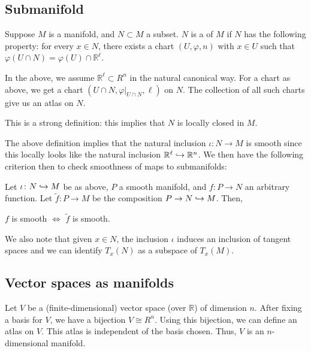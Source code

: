 \documentclass[12pt]{article}
\begin{document}
\subsection{Submanifold}

\begin{defn} \label{defn:submanifold}
	Suppose $M$ is a manifold, and $N \subset M$ a subset. $N$ is a  of $M$ if $N$ has the following property: for every $x \in N$, there exists a chart $(U, \varphi, n)$ with $x \in U$ such that $\varphi(U \cap N) = \varphi(U) \cap \mathbb{R}^{\ell}$. 
\end{defn}
\begin{rem} \label{rem:submanifold}
	In the above, we assume $\mathbb{R}^{\ell} \subset R^{n}$ in the natural canonical way. \newline
	For a chart as above, we get a chart $(U \cap N, \varphi|_{U \cap N}, \ell)$ on $N$. 
	The collection of all such charts give us an atlas on $N$.

	This is a strong definition: this implies that $N$ is locally closed in $M$.
\end{rem}

The above definition implies that the natural inclusion $\iota \colon N \to M$ is smooth since this locally looks like the natural inclusion $\mathbb{R}^{\ell} \hookrightarrow \mathbb{R}^{n}$.
We then have the following criterion then to check smoothness of maps to submanifolds:
\begin{thm} \label{thm:smoothness-into-submanifold}
	Let $\iota \colon N \hookrightarrow M$ be as above, $P$ a smooth manifold, and $f \colon P \to N$ an arbitrary function. \newline
	Let $\widetilde{f} \colon P \to M$ be the composition $P \to N \hookrightarrow M$. Then,
	\begin{center}
		$f$ is smooth $\Leftrightarrow$ $\widetilde{f}$ is smooth.
	\end{center}
\end{thm}

We also note that given $x \in N$, the inclusion $\iota$ induces an inclusion of tangent spaces and we can identify $T_{x}(N)$ as a subspace of $T_{x}(M)$.

\subsection{Vector spaces as manifolds} \label{subsec:vector-spaces-manifolds}

Let $V$ be a (finite-dimensional) vector space (over $\mathbb{R}$) of dimension $n$. 
After fixing a basis for $V$, we have a bijection $V \cong R^{n}$. 
Using this bijection, we can define an atlas on $V$. 
This atlas is independent of the basis chosen. 
Thus, $V$ is an $n$-dimensional manifold. 
\end{document}

